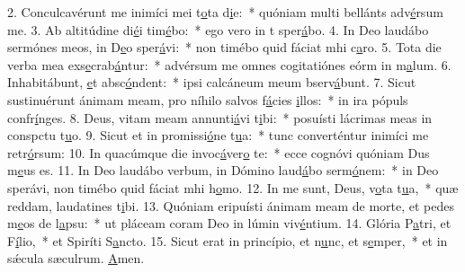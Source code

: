 2. Conculcavérunt me inimíci mei t\uline{o}ta d\uline{i}e:~* quóniam multi bellánts adv\uline{é}rsum me.
3. Ab altitúdine di\uline{é}i tim\uline{é}bo:~* ego vero in t sper\uline{á}bo.
4. In Deo laudábo sermónes meos, in D\uline{e}o sper\uline{á}vi:~* non timébo quid fáciat mhi c\uline{a}ro.
5. Tota die verba mea exs\uline{e}crab\uline{á}ntur:~* advérsum me omnes cogitatiónes eórm in m\uline{a}lum.
6. Inhabitábunt, \uline{e}t absc\uline{ó}ndent:~* ipsi calcáneum meum bserv\uline{á}bunt.
7. Sicut sustinuérunt ánimam meam, pro níhilo salvos f\uline{á}cies \uline{i}llos:~* in ira pópuls confr\uline{í}nges.
8. Deus, vitam meam annunti\uline{á}vi t\uline{i}bi:~* posuísti lácrimas meas in conspctu t\uline{u}o.
9. Sicut et in promissi\uline{ó}ne t\uline{u}a:~* tunc converténtur inimíci me retr\uline{ó}rsum:
10. In quacúmque die invoc\uline{á}ver\uline{o} te:~* ecce cognóvi quóniam Dus m\uline{e}us es.
11. In Deo laudábo verbum, in Dómino laud\uline{á}bo serm\uline{ó}nem:~* in Deo sperávi, non timébo quid fáciat mhi h\uline{o}mo.
12. In me sunt, Deus, v\uline{o}ta t\uline{u}a,~* quæ reddam, laudatines t\uline{i}bi.
13. Quóniam eripuísti ánimam meam de morte, et pedes m\uline{e}os de l\uline{a}psu:~* ut pláceam coram Deo in lúmin viv\uline{é}ntium.
14. Glória P\uline{a}tri, et F\uline{í}lio,~* et Spiríti S\uline{a}ncto.
15. Sicut erat in princípio, et n\uline{u}nc, et s\uline{e}mper,~* et in sǽcula sæculrum. \uline{A}men.

